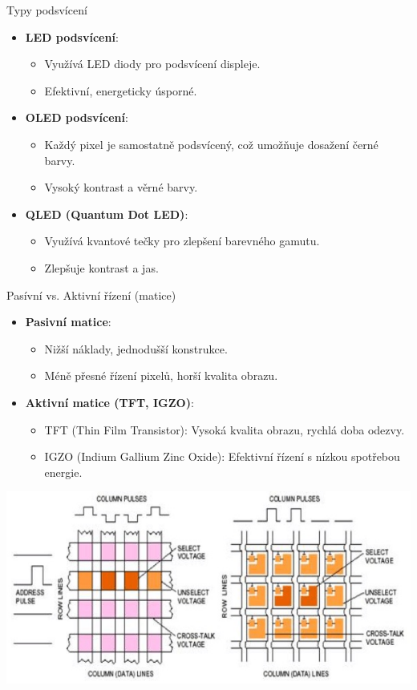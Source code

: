 \documentclass[aspectratio=43]{beamer}
\begin{document}
\begin{frame}{Typy podsvícení}
    \begin{itemize}
        \item \textbf{LED podsvícení}:
        \begin{itemize}
            \item Využívá LED diody pro podsvícení displeje.
            \item Efektivní, energeticky úsporné.
        \end{itemize}
        \item \textbf{OLED podsvícení}:
        \begin{itemize}
            \item Každý pixel je samostatně podsvícený, což umožňuje dosažení černé barvy.
            \item Vysoký kontrast a věrné barvy.
        \end{itemize}
        \item \textbf{QLED (Quantum Dot LED)}:
        \begin{itemize}
            \item Využívá kvantové tečky pro zlepšení barevného gamutu.
            \item Zlepšuje kontrast a jas.
        \end{itemize}
    \end{itemize}
\end{frame}

\begin{frame}{Pasívní vs. Aktivní řízení (matice)}
    \begin{itemize}
        \item \textbf{Pasivní matice}:
        \begin{itemize}
            \item Nižší náklady, jednodušší konstrukce.
            \item Méně přesné řízení pixelů, horší kvalita obrazu.
        \end{itemize}
        \item \textbf{Aktivní matice (TFT, IGZO)}:
        \begin{itemize}
            \item TFT (Thin Film Transistor): Vysoká kvalita obrazu, rychlá doba odezvy.
            \item IGZO (Indium Gallium Zinc Oxide): Efektivní řízení s nízkou spotřebou energie.
        \end{itemize}
    \end{itemize}
    \begin{center}
        \includegraphics[width=0.6\linewidth]{extrahovane_obrazky/matrix.jpg}
    \end{center}
\end{frame}
\end{document}
